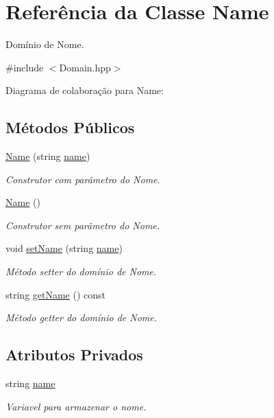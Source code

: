\hypertarget{className}{}\section{Referência da Classe Name}
\label{className}


Domínio de Nome.  




{\ttfamily \#include $<$Domain.\+hpp$>$}



Diagrama de colaboração para Name\+:
\subsection*{Métodos Públicos}
\begin{DoxyCompactItemize}
\item 
\hyperlink{className_af2524c071f5b2ccf887cbd61460c4c70}{Name} (string \hyperlink{className_ae8641ff4d989eb0f990aacd5dba0e42b}{name})
\begin{DoxyCompactList}\small\item\em Construtor com parâmetro do Nome. \end{DoxyCompactList}\item 
\hyperlink{className_a12a92d46d52b216ccaa86e3cb1539e58}{Name} ()
\begin{DoxyCompactList}\small\item\em Construtor sem parâmetro do Nome. \end{DoxyCompactList}\item 
void \hyperlink{className_a7207dd93f876f025871f5a1873ea093c}{set\+Name} (string \hyperlink{className_ae8641ff4d989eb0f990aacd5dba0e42b}{name})
\begin{DoxyCompactList}\small\item\em Método setter do domínio de Nome. \end{DoxyCompactList}\item 
string \hyperlink{className_a54879872f0b3d8363093ca81e8bfe228}{get\+Name} () const 
\begin{DoxyCompactList}\small\item\em Método getter do domínio de Nome. \end{DoxyCompactList}\end{DoxyCompactItemize}
\subsection*{Atributos Privados}
\begin{DoxyCompactItemize}
\item 
string \hyperlink{className_ae8641ff4d989eb0f990aacd5dba0e42b}{name}\hypertarget{className_ae8641ff4d989eb0f990aacd5dba0e42b}{}\label{className_ae8641ff4d989eb0f990aacd5dba0e42b}

\begin{DoxyCompactList}\small\item\em Variavel para armazenar o nome. \end{DoxyCompactList}\end{DoxyCompactItemize}


